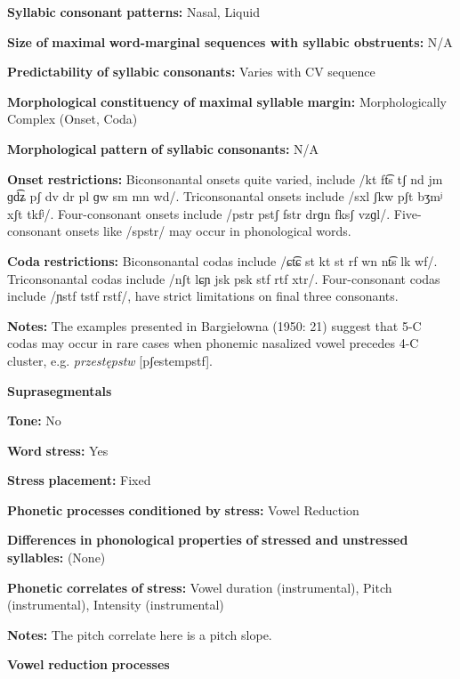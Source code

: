 \begin{styleBody}
\textbf{Syllabic} \textbf{consonant} \textbf{patterns:} Nasal, Liquid

\textbf{Size} \textbf{of} \textbf{maximal} \textbf{word{}-marginal sequences with syllabic obstruents:} N/A

\textbf{Predictability} \textbf{of} \textbf{syllabic} \textbf{consonants:} Varies with CV sequence

\textbf{Morphological} \textbf{constituency} \textbf{of} \textbf{maximal} \textbf{syllable} \textbf{margin:} Morphologically Complex (Onset, Coda)

\textbf{Morphological} \textbf{pattern} \textbf{of} \textbf{syllabic} \textbf{consonants:} N/A

\textbf{Onset} \textbf{restrictions:} Biconsonantal onsets quite varied, include /kt ft͡s tʃ nd jm ɡd͡ʑ pʃ dv dr pl ɡw sm mn wd/. Triconsonantal onsets include /sxl ʃkw pʃt bʒmʲ xʃt tkfʲ/. Four-consonant onsets include /pstr pstʃ fstr drɡn fksʃ vzɡl/. Five-consonant onsets like /spstr/ may occur in phonological words.

\textbf{Coda} \textbf{restrictions:} Biconsonantal codas include /ɕt͡ɕ st kt st rf wn nt͡s lk wf/. Triconsonantal codas include /nʃt lɕɲ jsk psk stf rtf xtr/. Four-consonant codas include /ɲstf tstf rstf/, have strict limitations on final three consonants.

\textbf{Notes:} The examples presented in Bargiełowna (1950: 21) suggest that 5-C codas may occur in rare cases when phonemic nasalized vowel precedes 4-C cluster, e.g. \textit{przestępstw} [pʃestempstf].

\textbf{Suprasegmentals}

\textbf{Tone:} No

\textbf{Word} \textbf{stress:} Yes

\textbf{Stress} \textbf{placement:} Fixed

\textbf{Phonetic} \textbf{processes} \textbf{conditioned} \textbf{by} \textbf{stress:} Vowel Reduction

\textbf{Differences} \textbf{in} \textbf{phonological} \textbf{properties} \textbf{of} \textbf{stressed} \textbf{and} \textbf{unstressed} \textbf{syllables:} (None)

\textbf{Phonetic} \textbf{correlates} \textbf{of} \textbf{stress:} Vowel duration (instrumental), Pitch (instrumental), Intensity (instrumental)

\textbf{Notes:} The pitch correlate here is a pitch slope.

\textbf{Vowel} \textbf{reduction} \textbf{processes}


\end{styleBody}
